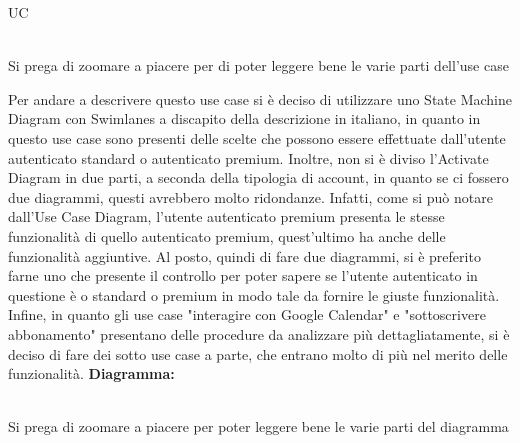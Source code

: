 \begin{listaPersonale}{UC}
\begin{listaPersonale2}[UC] {}
    \end{listaPersonale2}





    \newpage

    \begin{center}
        \\
        Si prega di zoomare a piacere per di poter leggere bene le varie parti dell'use case
    \end{center}
    Per andare a descrivere questo use case si è deciso di utilizzare uno State Machine Diagram con Swimlanes a discapito della descrizione in italiano, in quanto in questo use case sono presenti delle scelte che possono essere effettuate dall'utente autenticato standard o autenticato premium. Inoltre, non si è diviso l'Activate Diagram in due parti, a seconda della tipologia di account, in quanto se ci fossero due diagrammi, questi avrebbero molto ridondanze. Infatti, come si può notare dall'Use Case Diagram, l'utente autenticato premium presenta le stesse funzionalità di quello autenticato premium, quest'ultimo ha anche delle funzionalità aggiuntive. Al posto, quindi di fare due diagrammi, si è preferito farne uno che presente il controllo per poter sapere se l'utente autenticato in questione è o standard o premium in modo tale da fornire le giuste funzionalità.
    Infine, in quanto gli use case "interagire con Google Calendar" e "sottoscrivere abbonamento" presentano delle procedure da analizzare più dettagliatamente, si è deciso di fare dei sotto use case a parte, che entrano molto di più nel merito delle funzionalità.
    \newpage
    \textbf{Diagramma:}
    \begin{center}
        \\
        Si prega di zoomare a piacere per poter leggere bene le varie parti del diagramma
    \end{center}



\end{listaPersonale}
